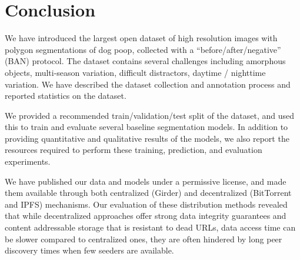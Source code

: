 \documentclass[10pt,twocolumn,letterpaper]{article}
\begin{document}





\section{Conclusion}

We have introduced the largest open dataset of high resolution images with polygon
  segmentations of dog poop, collected with a ``before/after/negative'' (BAN) protocol.
The dataset contains several challenges including amorphous objects, multi-season variation, difficult
  distractors, daytime / nighttime variation.
We have described the dataset collection and annotation process and reported statistics on the dataset.

We provided a recommended train/validation/test split of the dataset, and used this to train and evaluate
  several baseline segmentation models.
In addition to providing quantitative and qualitative results of the models, we also report the resources
  required to perform these training, prediction, and evaluation experiments.

We have published our data and models under a permissive license, and made them available through both
  centralized (Girder) and decentralized (BitTorrent and IPFS) mechanisms.
Our evaluation of these distribution methods revealed that while decentralized approaches offer strong data
  integrity guarantees and content addressable storage that is resistant to dead URLs, data access time can be
  slower compared to centralized ones, they are often hindered by long peer discovery times when few seeders
  are available.
\end{document}
